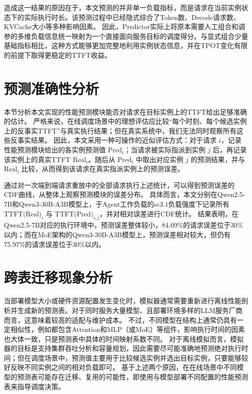 造成这一结果的原因在于，本文预测的并非单一负载指标，而是请求在当前实例状态下的实际执行时长。该预测过程中已经隐式综合了Token数、Decode请求数、KVCache大小等多种影响因素。
因此，Predictor实际上将原本需要人工组合和调参的多维负载信息统一映射为一个直接面向服务目标的调度得分。与显式组合少量基础指标相比，这种方式能够更加完整地利用实例状态信息，并在TPOT变化有限的前提下取得更稳定的TTFT收益。



\section{预测准确性分析}
本节分析本文实现的性能预测模块能否对请求在目标实例上的TTFT给出足够准确的估计。
严格来说，在线调度场景中的理想评估应比较“每个时刻、每个候选实例上的反事实TTFT”与真实执行结果；但在真实系统中，我们无法同时观察所有这些反事实结果。
因此，本文采用一种可操作的近似评估方式：对于请求 \(i\)，记录性能预测模块给出的各实例预测值 \(\text{Pred}_i\)；当请求被实际指派到实例 \(j\) 后，再记录该实例上的真实TTFT \(\text{Real}_i\)。随后从 \(\text{Pred}_i\) 中取出对应实例 \(j\) 的预测结果，并与 \(\text{Real}_i\) 比较，从而得到该请求在真实指派实例上的预测误差。

通过对一次端到端请求重放中的全部请求执行上述统计，可以得到预测误差的CDF曲线，从整体上观察预测模块的误差分布。
具体而言，本文分别在Qwen2.5-7B和Qwen3-30B-A3B模型上，于Agent工作负载的sc3.1负载强度下记录所有 \(\text{TTFT(Real)}_i\) 与 \(\text{TTFT(Pred)}_{i,j}\)，并对相对误差进行CDF统计。
结果表明，在Qwen2.5-7B对应的执行环境中，预测误差整体较小，84.09\%的请求误差位于30\%以内；而在MoE架构的Qwen3-30B-A3B模型上，预测误差相对较大，但仍有75.97\%的请求误差位于30\%以内。

\section{跨表迁移现象分析}
\label{sec:crosstable}

当部署模型大小或硬件资源配置发生变化时，模拟器通常需要重新进行离线性能剖析并生成新的预测表。对于同时服务大量模型、且部署环境多样的LLM服务厂商而言，这意味着较高的适配与维护成本。
不过，不同模型在结构上通常仍具有一定相似性，例如都包含Attention和MLP（或MoE）等组件，影响执行时间的因素也大体一致，只是预测表中具体的时间映射系数不同。
对于离线模拟而言，模拟器的目标是支持集群吞吐分析和容量规划，因此需要尽可能准确地预测绝对执行时间；但在调度场景中，预测值主要用于比较候选实例并选出目标实例，只要能够较好反映不同实例之间的相对负载即可。
基于上述两个原因，在在线场景中不同模型的预测表可能存在迁移、复用的可能性，即使用与模型部署不同配置的性能预测表来指导调度决策。

